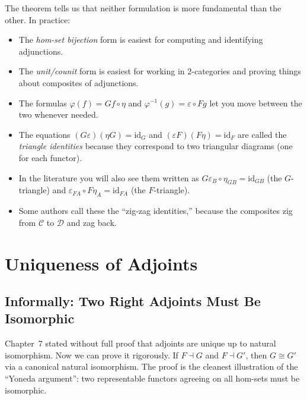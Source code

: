The theorem tells us that neither formulation is more fundamental than the
other. In practice:
\begin{itemize}
  \item The \emph{hom-set bijection} form is easiest for computing and
        identifying adjunctions.
  \item The \emph{unit/counit} form is easiest for working in 2-categories
        and proving things about composites of adjunctions.
  \item The formulas $\varphi(f) = Gf \circ \eta$ and $\varphi^{-1}(g) =
        \varepsilon \circ Fg$ let you move between the two whenever needed.
\end{itemize}

\begin{howtosay}
\begin{itemize}
  \item The equations $(G\varepsilon)(\eta G) = \mathrm{id}_G$ and
        $(\varepsilon F)(F\eta) = \mathrm{id}_F$ are called the
        \emph{triangle identities} because they correspond to two triangular
        diagrams (one for each functor).
  \item In the literature you will also see them written as
        $G\varepsilon_B \circ \eta_{GB} = \mathrm{id}_{GB}$ (the $G$-triangle)
        and $\varepsilon_{FA} \circ F\eta_A = \mathrm{id}_{FA}$ (the
        $F$-triangle).
  \item Some authors call these the ``zig-zag identities,'' because the
        composites zig from $\mathcal{C}$ to $\mathcal{D}$ and zag back.
\end{itemize}
\end{howtosay}


\section{Uniqueness of Adjoints}
\label{sec:uniqueness-adjoints}

\subsection{Informally: Two Right Adjoints Must Be Isomorphic}

Chapter~7 stated without full proof that adjoints are unique up to natural
isomorphism. Now we can prove it rigorously. If $F \dashv G$ and $F \dashv G'$,
then $G \cong G'$ via a canonical natural isomorphism. The proof is the cleanest
illustration of the ``Yoneda argument'': two representable functors agreeing on
all hom-sets must be isomorphic.

